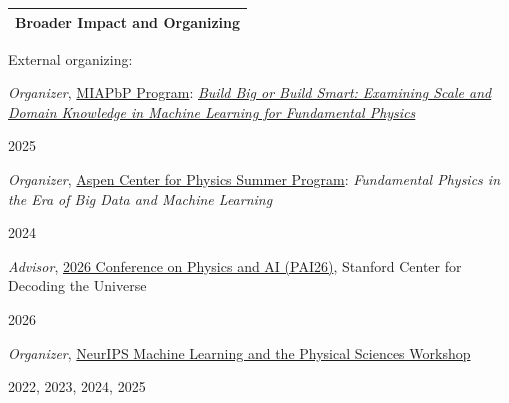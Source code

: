 \documentclass[letterpaper,11pt]{article}
\makeatletter
\newenvironment{packed_itemize}{
\begin{itemize}[label=\raisebox{0.25ex}{\tiny$\bullet$}, topsep=0pt, partopsep=0pt]
  \setlength{\itemsep}{4.0pt}
  \setlength{\parskip}{0pt}
  \setlength{\parsep}{0pt}}{\end{itemize}
}
\newcommand{\cvsection}[2]{%
  \needspace{4\baselineskip}%
  \par\vspace{3mm}%
  \noindent
  \begin{tabular*}{\textwidth}{l@{\extracolsep{\fill}}}
  \large {\sc \Large{#2}}\\
  \hline
  \end{tabular*}\vspace{3mm}%
}
\makeatother
\begin{document}

\cvsection{\faUsers}{Broader Impact and Organizing}

\noindent
External organizing:
\begin{packed_itemize}
\item \noindent\begin{minipage}[t]{0.84\linewidth}
      \emph{Organizer}, \href{https://www.munich-iapbp.de/}{MIAPbP Program}: 
      \emph{\href{https://www.munich-iapbp.de/activities/activities-2025/machine-learning}{Build Big or Build Smart: Examining Scale and Domain Knowledge in Machine Learning for Fundamental Physics}}
      \end{minipage}%
      \begin{minipage}[t]{0.15\linewidth}
      \begin{flushright}
      2025
      \end{flushright}
      \end{minipage}\vspace{1.5mm}
\item \noindent\begin{minipage}[t]{0.84\linewidth}
      \emph{Organizer}, \href{https://aspenphys.org/summer-workshops/#event2401}{Aspen Center for Physics Summer Program}: 
      \emph{Fundamental Physics in the Era of Big Data and Machine Learning}
      \end{minipage}%
      \begin{minipage}[t]{0.15\linewidth}
      \begin{flushright}
      2024
      \end{flushright}
      \end{minipage}\vspace{1.5mm}
\item \noindent\begin{minipage}[t]{0.84\linewidth}
      \emph{Advisor}, \href{https://datascience.stanford.edu/research/center-decoding-universe/conference/2026-conference-physics-and-ai-pai26}{2026 Conference on Physics and AI (PAI26)}, Stanford Center for Decoding the Universe
      \end{minipage}%
      \begin{minipage}[t]{0.15\linewidth}
      \begin{flushright}
      2026
      \end{flushright}
      \end{minipage}\vspace{1.5mm}
\item \noindent\begin{minipage}[t]{0.79\linewidth}
      \emph{Organizer}, \href{https://ml4physicalsciences.github.io/}{NeurIPS Machine Learning and the Physical Sciences Workshop}
      \end{minipage}%
      \begin{minipage}[t]{0.2\linewidth}
      \begin{flushright}
      2022, 2023, 2024, 2025
      \end{flushright}
      \end{minipage}  %
\end{packed_itemize}
\end{document}

